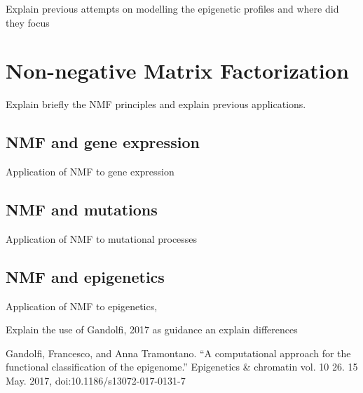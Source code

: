 Explain previous attempts on modelling the epigenetic profiles and where did they focus

\section{Non-negative Matrix Factorization}

Explain briefly the NMF principles and explain previous applications.

\subsection{NMF and gene expression}

Application of NMF to gene expression

\subsection{NMF and mutations}

Application of NMF to mutational processes

\subsection{NMF and epigenetics}

Application of NMF to epigenetics,

Explain the use of Gandolfi, 2017 as guidance an explain differences

Gandolfi, Francesco, and Anna Tramontano. “A computational approach for the functional classification of the epigenome.” Epigenetics & chromatin vol. 10 26. 15 May. 2017, doi:10.1186/s13072-017-0131-7
